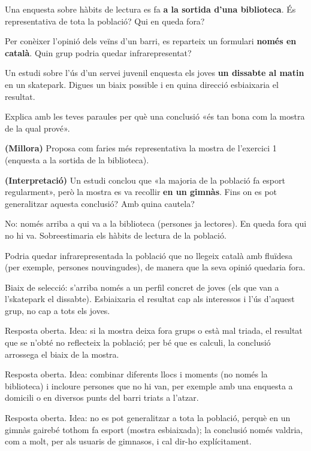\begin{exercicis}
\begin{exlist}
  \item Una enquesta sobre hàbits de lectura es fa \textbf{a la sortida d'una biblioteca}.
        És representativa de tota la població? Qui en queda fora?
  \item Per conèixer l'opinió dels veïns d'un barri, es reparteix un formulari
        \textbf{només en català}. Quin grup podria quedar infrarepresentat?
  \item Un estudi sobre l'ús d'un servei juvenil enquesta els joves \textbf{un dissabte al
        matin} en un skatepark. Digues un biaix possible i en quina direcció esbiaixaria
        el resultat.
  \item Explica amb les teves paraules per què una conclusió «és tan bona com la mostra de
        la qual prové».
  \item \textbf{(Millora)} Proposa com faries més representativa la mostra de l'exercici 1
        (enquesta a la sortida de la biblioteca).
  \item \textbf{(Interpretació)} Un estudi conclou que «la majoria de la població fa
        esport regularment», però la mostra es va recollir \textbf{en un gimnàs}. Fins on
        es pot generalitzar aquesta conclusió? Amb quina cautela?
\end{exlist}
\end{exercicis}

\begin{solucions}
\begin{sollist}
  \item No: només arriba a qui va a la biblioteca (persones ja lectores). En queda fora
        qui no hi va. Sobreestimaria els hàbits de lectura de la població.
  \item Podria quedar infrarepresentada la població que no llegeix català amb fluïdesa
        (per exemple, persones nouvingudes), de manera que la seva opinió quedaria fora.
  \item Biaix de selecció: s'arriba només a un perfil concret de joves (els que van a
        l'skatepark el dissabte). Esbiaixaria el resultat cap als interessos i l'ús
        d'aquest grup, no cap a tots els joves.
  \item Resposta oberta. Idea: si la mostra deixa fora grups o està mal triada, el
        resultat que se n'obté no reflecteix la població; per bé que es calculi, la
        conclusió arrossega el biaix de la mostra.
  \item Resposta oberta. Idea: combinar diferents llocs i moments (no només la biblioteca)
        i incloure persones que no hi van, per exemple amb una enquesta a domicili o en
        diversos punts del barri triats a l'atzar.
  \item Resposta oberta. Idea: no es pot generalitzar a tota la població, perquè en un
        gimnàs gairebé tothom fa esport (mostra esbiaixada); la conclusió només valdria,
        com a molt, per als usuaris de gimnasos, i cal dir-ho explícitament.
\end{sollist}
\end{solucions}
